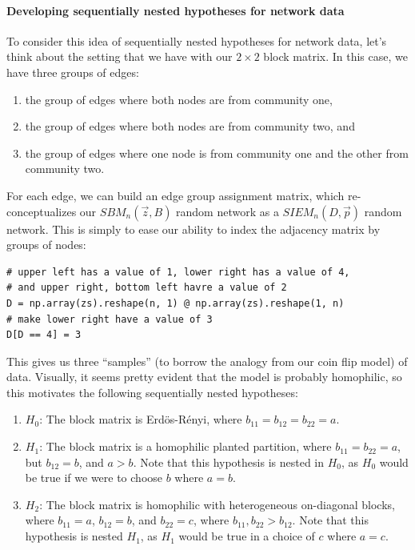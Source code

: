 \paragraph*{Developing sequentially nested hypotheses for network data}

To consider this idea of sequentially nested hypotheses for network data, let's think about the setting that we have with our $2 \times 2$ block matrix. In this case, we have three groups of edges: 
\begin{enumerate}
    \item the group of edges where both nodes are from community one,
    \item the group of edges where both nodes are from community two, and 
    \item the group of edges where one node is from community one and the other from community two.
\end{enumerate}
For each edge, we can build an edge group assignment matrix, which re-conceptualizes our $SBM_n(\vec z, B)$ random network as a $SIEM_n(D, \vec p)$ random network. This is simply to ease our ability to index the adjacency matrix by groups of nodes:

\begin{lstlisting}[style=python]
# upper left has a value of 1, lower right has a value of 4,
# and upper right, bottom left havre a value of 2
D = np.array(zs).reshape(n, 1) @ np.array(zs).reshape(1, n)
# make lower right have a value of 3
D[D == 4] = 3
\end{lstlisting}

This gives us three ``samples'' (to borrow the analogy from our coin flip model) of data. Visually, it seems pretty evident that the model is probably homophilic, so this motivates the following sequentially nested hypotheses:
\begin{enumerate}
    \item $H_0$: The block matrix is Erd\"os-R\'enyi, where $b_{11} = b_{12} = b_{22} = a$.
    \item $H_1$: The block matrix is a homophilic planted partition, where $b_{11} = b_{22} = a$, but $b_{12} = b$, and $a > b$. Note that this hypothesis is nested in $H_0$, as $H_0$ would be true if we were to choose $b$ where $a = b$.
    \item $H_2$: The block matrix is homophilic with heterogeneous on-diagonal blocks, where $b_{11} = a$, $b_{12} = b$, and $b_{22} = c$, where $b_{11}, b_{22} > b_{12}$. Note that this hypothesis is nested $H_1$, as $H_1$ would be true in a choice of $c$ where $a = c$.
\end{enumerate}


